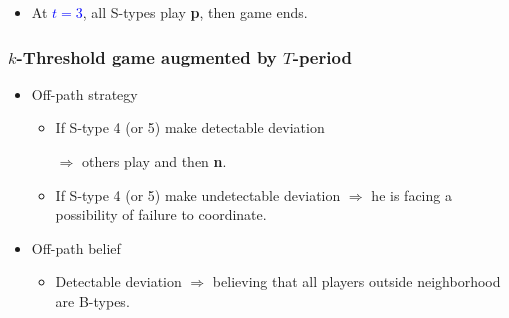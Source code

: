 \documentclass[8pt]{beamer}
\begin{document}
\begin{frame}
\begin{itemize}
\begin{itemize}
\pause
\item At \textcolor{blue}{$t=3$}, all S-types play \textbf{p}, then game ends.

\end{itemize}

\end{itemize}



\end{frame}


\begin{frame}
  \frametitle{$k$-Threshold game augmented by $T$-period }


\begin{itemize}

\item Off-path strategy
\begin{itemize}
\item If S-type 4 (or 5) make detectable deviation 

$\Rightarrow$ others play  and then \textbf{n}.
\item If S-type 4 (or 5) make undetectable deviation $\Rightarrow$ he is facing a possibility of failure to coordinate.
\end{itemize}
\item Off-path belief
\begin{itemize}
\item Detectable deviation $\Rightarrow$ believing that all players outside neighborhood are B-types. 
\end{itemize}
\end{itemize}



\end{frame}
\end{document}
